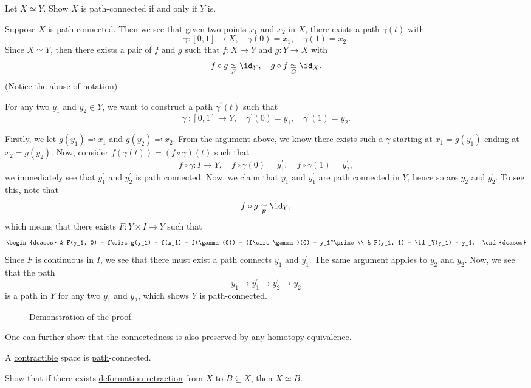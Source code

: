 \begin{exercise}
	Let \(X\simeq Y\). Show \(X\) is path-connected if and only if \(Y\) is.
\end{exercise}
\begin{answer}
	Suppose \(X\) is path-connected. Then we see that given two points \(x_1\) and \(x_2\) in \(X\), there exists a path \(\gamma(t)\) with
	\[
		\gamma\colon [0, 1]\to X,\quad \gamma(0) = x_1,\quad \gamma(1) = x_2.
	\]
	Since \(X\simeq Y\), then there exists a pair of \(f\) and \(g\) such that \(f\colon X\to Y\) and \(g\colon Y\to X\) with
	\[
		f\circ g\underset{F}{\simeq} \id_Y,\quad g\circ f\underset{G}{\simeq} \id_X.
	\]
	(Notice the abuse of notation)

	For any two \(y_1\) and \(y_2\in Y\), we want to construct a path \(\gamma^\prime (t)\) such that
	\[
		\gamma^\prime \colon [0, 1]\to Y,\quad \gamma^\prime (0) = y_1,\quad \gamma^\prime (1) = y_2.
	\]

	Firstly, we let \(g(y_1) \eqqcolon x_1\) and \(g(y_2) \eqqcolon x_2\). From the argument above, we know there exists such a \(\gamma\) starting at \(x_1 = g(y_1)\) ending at \(x_2 = g(y_2)\). Now, consider \(f(\gamma(t)) = (f\circ \gamma) (t)\) such that
	\[
		f\circ \gamma\colon I\to Y,\quad f\circ \gamma(0) = y_1^\prime,\quad f\circ \gamma(1) = y_2^\prime,
	\]
	we immediately see that \(y_{1}^\prime\) and \(y_2^\prime \) is path connected. Now, we claim that \(y_1\) and \(y_1^\prime\) are path connected in \(Y\), hence so are \(y_2\) and \(y_2^\prime \). To see this, note that
	\[
		f\circ g\underset{F}{\simeq} \id_Y,
	\]
	which means that there exists \(F\colon Y\times I\to Y\) such that
	\[
		\begin{dcases}
			 & F(y_1, 0) = f\circ g(y_1) = f(x_1) = f(\gamma(0)) = (f\circ \gamma)(0) = y_1^\prime \\
			 & F(y_1, 1) = \id_Y(y_1) = y_1.
		\end{dcases}
	\]
	Since \(F\) is continuous in \(I\), we see that there must exist a path connects \(y_1\) and \(y_1^\prime \). The same argument applies to \(y_2\) and \(y_2^\prime \). Now, we see that the path
	\[
		y_1 \to y_1^\prime \to y_2^\prime \to y_2
	\]
	is a path in \(Y\) for any two \(y_1\) and \(y_2\), which shows \(Y\) is path-connected.

	\begin{figure}[H]
		\centering
		\caption{Demonstration of the proof.}
		\label{fig:eg:path-connected}
	\end{figure}
\end{answer}

One can further show that the connectedness is also preserved by any \hyperref[def:homotopy-equivalence]{homotopy equivalence}.

\begin{corollary}
	A \hyperref[def:contractible]{contractible} space is \hyperref[def:path]{path}-connected.
\end{corollary}

\begin{exercise}
	Show that if there exists \hyperref[def:deformation-retraction]{deformation retraction} from \(X\) to \(B\subseteq X\), then \(X\simeq B\).
\end{exercise}